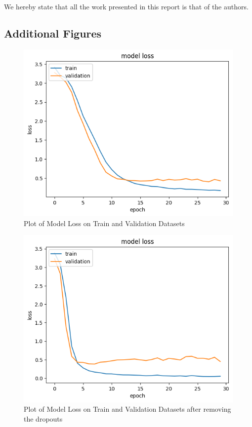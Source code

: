 \documentclass[10pt,conference]{IEEEtran}
\begin{document}
We hereby state that all the work presented in this report is that of the authors.




\newpage
\onecolumn

\appendix
   

\subsection{Additional Figures}

\setcounter{figure}{0}  
\begin{figure}[!tbhp]
\centering
\includegraphics[width = 0.8\linewidth]{loss.png}
\caption{Plot of Model Loss on Train and Validation Datasets}
\label{fig:loss}
\end{figure}

\begin{figure}[!tbhp]
\centering
\includegraphics[width = 0.8\linewidth]{loss_d.png}
\caption{Plot of Model Loss on Train and Validation Datasets after removing the dropouts}
\label{fig:lossd}
\end{figure}
\end{document}
